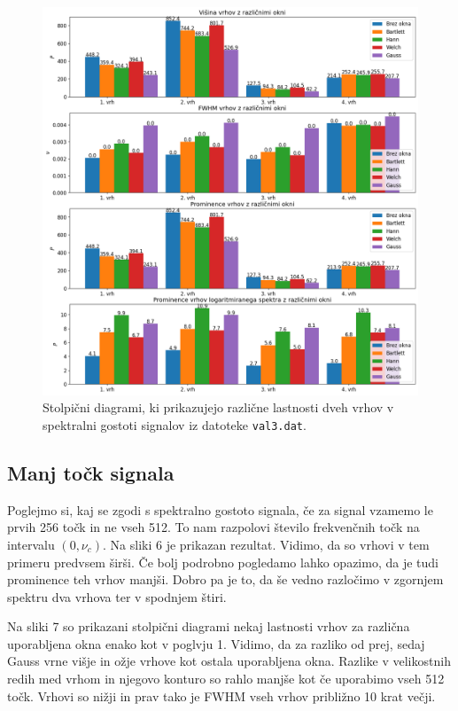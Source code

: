 \documentclass[slovene,11pt,a4paper]{article}
\begin{document}
\begin{figure}[h!]
\centering
\includegraphics[width=15cm]{slika5.png}
\caption{Stolpični diagrami, ki prikazujejo različne lastnosti dveh vrhov v spektralni gostoti signalov iz datoteke \texttt{val3.dat}.}
\end{figure}

\subsection{Manj točk signala}

Poglejmo si, kaj se zgodi s spektralno gostoto signala, če za signal vzamemo le prvih 256 točk in ne vseh 512. To nam razpolovi število frekvenčnih točk na intervalu $(0, \nu_c)$. Na sliki 6 je prikazan rezultat. Vidimo, da so vrhovi v tem primeru predvsem širši. Če bolj podrobno pogledamo lahko opazimo, da je tudi prominence teh vrhov manjši. Dobro pa je to, da še vedno razločimo v zgornjem spektru dva vrhova ter v spodnjem štiri.

Na sliki 7 so prikazani stolpični diagrami nekaj lastnosti vrhov za različna uporabljena okna enako kot v poglvju 1. Vidimo, da za razliko od prej, sedaj Gauss vrne višje in ožje vrhove kot ostala uporabljena okna. Razlike v velikostnih redih med vrhom in njegovo konturo so rahlo manjše kot če uporabimo vseh 512 točk. Vrhovi so nižji in prav tako je FWHM vseh vrhov približno 10 krat večji.
\end{document}
